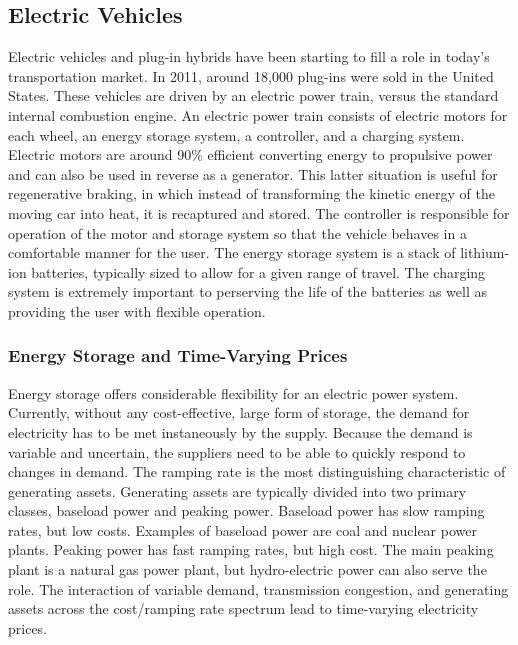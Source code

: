 \subsection{Electric Vehicles}
Electric vehicles and plug-in hybrids have been starting to fill a role in today's transportation market.  In 2011, around 18,000 plug-ins were sold in the United States.  These vehicles are driven by an electric power train, versus the standard internal combustion engine.  An electric power train consists of electric motors for each wheel, an energy storage system, a controller, and a charging system.  Electric motors are around 90\% efficient converting energy to propulsive power and can also be used in reverse as a generator.  This latter situation is useful for regenerative braking, in which instead of transforming the kinetic energy of the moving car into heat, it is recaptured and stored.  The controller is responsible for operation of the motor and storage system so that the vehicle behaves in a comfortable manner for the user.  The energy storage system is a stack of lithium-ion batteries, typically sized to allow for a given range of travel.  The charging system is extremely important to perserving the life of the batteries as well as providing the user with flexible operation.  

\subsubsection{Energy Storage and Time-Varying Prices}
Energy storage offers considerable flexibility for an electric power system.  Currently, without any cost-effective, large form of storage, the demand for electricity has to be met instaneously by the supply.  Because the demand is variable and uncertain, the suppliers need to be able to quickly respond to changes in demand.  The ramping rate is the most distinguishing characteristic of generating assets.  Generating assets are typically divided into two primary classes, baseload power and peaking power.  Baseload power has slow ramping rates, but low costs.  Examples of baseload power are coal and nuclear power plants.  Peaking power has fast ramping rates, but high cost.  The main peaking plant is a natural gas power plant, but hydro-electric power can also serve the role.  The interaction of variable demand, transmission congestion, and generating assets across the cost/ramping rate spectrum lead to time-varying electricity prices.    

